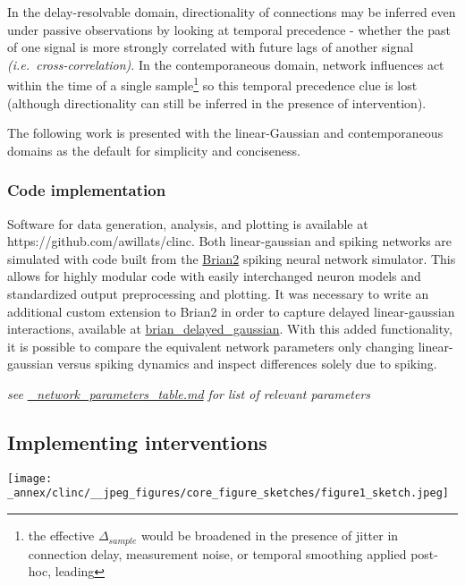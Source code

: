 In the delay-resolvable domain, directionality of connections may be
inferred even under passive observations by looking at temporal
precedence - whether the past of one signal is more strongly correlated
with future lags of another signal \emph{(i.e.~cross-correlation)}. In
the contemporaneous domain, network influences act within the time of a
single sample\footnote{the effective \(\Delta_{sample}\) would be
  broadened in the presence of jitter in connection delay, measurement
  noise, or temporal smoothing applied post-hoc, leading} so this
temporal precedence clue is lost (although directionality can still be
inferred in the presence of intervention).

The following work is presented with the linear-Gaussian and
contemporaneous domains as the default for simplicity and conciseness.

\hypertarget{code-implementation}{%
\subsubsection{Code implementation}\label{code-implementation}}

Software for data generation, analysis, and plotting is available at
https://github.com/awillats/clinc. Both linear-gaussian and spiking
networks are simulated with code built from the
\href{https://elifesciences.org/articles/47314}{Brian2} spiking neural
network simulator. This allows for highly modular code with easily
interchanged neuron models and standardized output preprocessing and
plotting. It was necessary to write an additional custom extension to
Brian2 in order to capture delayed linear-gaussian interactions,
available at
\href{https://github.com/awillats/brian_delayed_gaussian}{brian\_delayed\_gaussian}.
With this added functionality, it is possible to compare the equivalent
network parameters only changing linear-gaussian versus spiking dynamics
and inspect differences solely due to spiking.

\emph{see \url{_network_parameters_table.md} for list of relevant
parameters}

\hypertarget{implementing-interventions}{%
\subsection{Implementing
interventions}\label{implementing-interventions}}

\texttt{[image: \_annex/clinc/\_\_jpeg\_figures/core\_figure\_sketches/figure1\_sketch.jpeg]}

